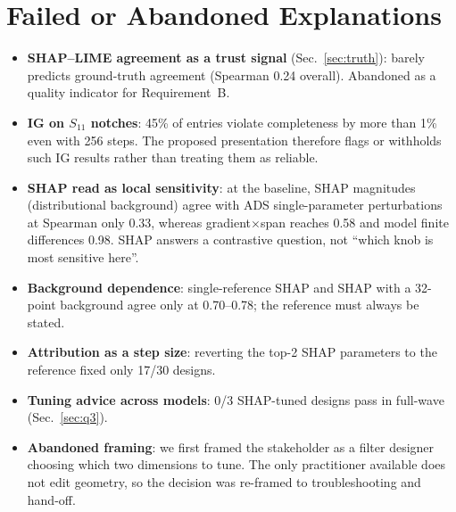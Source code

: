 \documentclass[conference,10pt]{IEEEtran}
\begin{document}
\section{Failed or Abandoned Explanations}
\begin{itemize}
\item \textbf{SHAP--LIME agreement as a trust signal} (Sec.~\ref{sec:truth}): barely predicts ground-truth agreement (Spearman 0.24 overall). Abandoned as a quality indicator for Requirement~B.
\item \textbf{IG on $S_{11}$ notches}: 45\% of entries violate completeness by more than 1\% even with 256 steps. The proposed presentation therefore flags or withholds such IG results rather than treating them as reliable.
\item \textbf{SHAP read as local sensitivity}: at the baseline, SHAP magnitudes (distributional background) agree with ADS single-parameter perturbations at Spearman only 0.33, whereas gradient$\times$span reaches 0.58 and model finite differences 0.98. SHAP answers a contrastive question, not ``which knob is most sensitive here''.
\item \textbf{Background dependence}: single-reference SHAP and SHAP with a 32-point background agree only at 0.70--0.78; the reference must always be stated.
\item \textbf{Attribution as a step size}: reverting the top-2 SHAP parameters to the reference fixed only 17/30 designs.
\item \textbf{Tuning advice across models}: 0/3 SHAP-tuned designs pass in full-wave (Sec.~\ref{sec:q3}).
\item \textbf{Abandoned framing}: we first framed the stakeholder as a filter designer choosing which two dimensions to tune. The only practitioner available does not edit geometry, so the decision was re-framed to troubleshooting and hand-off.
\end{itemize}

\end{document}
